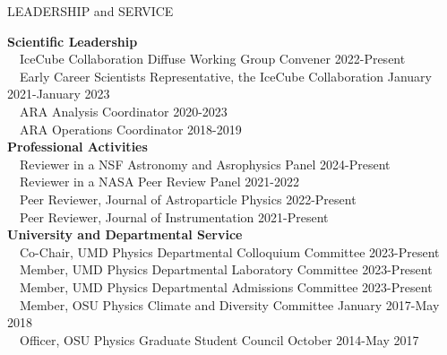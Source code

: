 \documentclass{resume} %
\begin{document}
\begin{rSection}{LEADERSHIP and SERVICE}

  \textbf{Scientific Leadership} \\
  \-\ \-\ IceCube Collaboration Diffuse Working Group Convener \hfill 2022-Present \\
  \-\ \-\ Early Career Scientists Representative, the IceCube Collaboration \hfill January 2021-January 2023 \\
  \-\ \-\ ARA Analysis Coordinator \hfill 2020-2023 \\
  \-\ \-\ ARA Operations Coordinator \hfill 2018-2019 \\

  \textbf{Professional Activities} \\
  \-\ \-\ Reviewer in a NSF Astronomy and Asrophysics Panel \hfill 2024-Present \\
  \-\ \-\ Reviewer in a NASA Peer Review Panel \hfill 2021-2022 \\
  \-\ \-\ Peer Reviewer, Journal of Astroparticle Physics \hfill 2022-Present \\
  \-\ \-\ Peer Reviewer, Journal of Instrumentation \hfill 2021-Present \\
  
  \textbf{University and Departmental Service} \\
  \-\ \-\ Co-Chair, UMD Physics Departmental Colloquium Committee \hfill 2023-Present \\
  \-\ \-\ Member, UMD Physics Departmental Laboratory Committee \hfill 2023-Present \\
  \-\ \-\ Member, UMD Physics Departmental Admissions Committee \hfill 2023-Present \\
  \-\ \-\ Member, OSU Physics Climate and Diversity Committee \hfill January 2017-May 2018\\
  \-\ \-\ Officer, OSU Physics Graduate Student Council \hfill October 2014-May 2017

\end{rSection}
\end{document}
